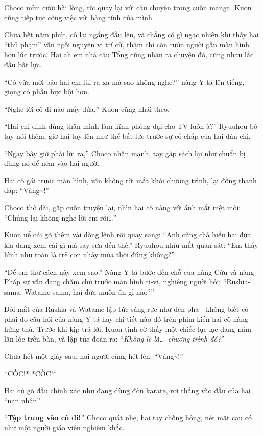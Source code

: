 \documentclass[../main.tex]{subfiles}
\begin{document}
Choco mỉm cười hài lòng, rồi quay lại với câu chuyện trong cuốn manga. Kuon cũng tiếp tục công việc với bảng tính của mình.

Chưa hết năm phút, cô lại ngẩng đầu lên, và chẳng có gì ngạc nhiên khi thấy hai ``thủ phạm'' vẫn ngồi nguyên vị trí cũ, thậm chí còn rướn người gần màn hình hơn lúc trước. Hai ah em nhà cậu Tổng cũng nhận ra chuyện đó, cùng nhau lắc đầu bất lực.


``Cô vừa mới bảo hai em lùi ra xa mà sao không nghe?'' nàng Y tá lên tiếng, giọng có phần bực bội hơn.

``Nghe lời cô đi nào mấy đứa,'' Kuon cũng nhái theo.

``Hai chị định dùng thân mình làm kính phóng đại cho TV luôn à?'' Ryuuhou bó tay nói thêm, giơ hai tay lên như thể bất lực trước sự cố chấp của hai đàn chị.

``Ngay bây giờ phải lùi ra,'' Choco nhấn mạnh, tay gập sách lại như chuẩn bị dùng nó để ném vào hai người.

Hai cô gái trước màn hình, vẫn không rời mắt khỏi chương trình, lại đồng thanh đáp: ``Vâng\~{}!''

Choco thở dài, gấp cuốn truyện lại, nhìn hai cô nàng với ánh mắt mệt mỏi: ``Chúng lại không nghe lời em rồi\dots''

Kuon uể oải gõ thêm vài dòng lệnh rồi quay sang: ``Anh cũng chả hiểu hai đứa kia đang xem cái gì mà say sưa đến thế.'' Ryuuhou nhíu mắt quan sát: ``Em thấy hình như toàn là trẻ con nhảy múa thôi đúng không?''

``Để em thử cách này xem sao.'' Nàng Y tá bước đến chỗ của nàng Cừu và nàng Pháp sư vẫn đang chăm chú trước màn hình ti-vi, nghiêng người hỏi: ``Rushia-sama, Watame-sama, hai đứa muốn ăn gì nào?''

Đôi mắt của Rushia và Watame lập tức sáng rực như đèn pha - không biết có phải do câu hỏi của nàng Y tá hay chi tiết nào đó trên phim kiến hai cô nàng hứng thú. Trước khi kịp trả lời, Kuon tình cờ thấy một chiếc lục lạc đang nằm lăn lóc trên bàn, và lập tức đoán ra: ``\textit{Không lẽ là\dots\ chương trình đó?}''

Chưa hết một giây sau, hai người cùng hét lên: ``Vâng\~{}!''

*CỐC!* *CỐC!*

Hai cú gõ đầu chính xác như đang dùng đòn karate, rơi thẳng vào đầu của hai ``nạn nhân''.


``\textbf{Tập trung vào cô đi!}'' Choco quát nhẹ, hai tay chống hông, nét mặt cau có như một người giáo viên nghiêm khắc.
\end{document}
